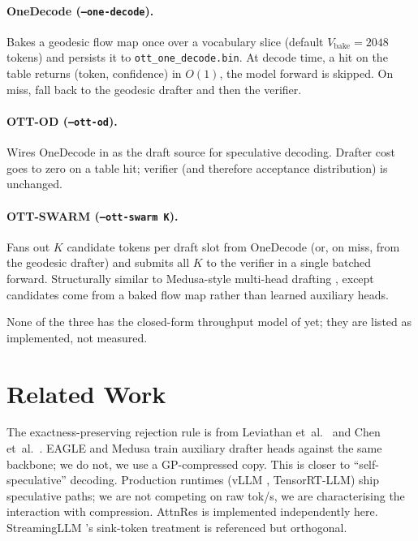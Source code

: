 \documentclass[11pt]{article}
\begin{document}
\paragraph{OneDecode (\texttt{--one-decode}).}  Bakes a geodesic flow
map once over a vocabulary slice (default $V_\text{bake}{=}2048$
tokens) and persists it to \texttt{ott\_one\_decode.bin}.  At decode
time, a hit on the table returns (token, confidence) in $O(1)$, the
model forward is skipped.  On miss, fall back to the geodesic drafter
and then the verifier.

\paragraph{OTT-OD (\texttt{--ott-od}).}  Wires OneDecode in as the
draft source for speculative decoding.  Drafter cost goes to zero
on a table hit; verifier (and therefore acceptance distribution) is
unchanged.

\paragraph{OTT-SWARM (\texttt{--ott-swarm K}).}  Fans out $K$ candidate
tokens per draft slot from OneDecode (or, on miss, from the geodesic
drafter) and submits all $K$ to the verifier in a single batched forward.
Structurally similar to Medusa-style multi-head drafting
\cite{cai2024medusa}, except candidates come from a baked flow map
rather than learned auxiliary heads.

\noindent
None of the three has the closed-form throughput model of
 yet; they are listed as
implemented, not measured.

\section{Related Work}
The exactness-preserving rejection rule is from Leviathan et~al.\
\cite{leviathan2023speculative} and Chen et~al.\ \cite{chen2023speculative}.
EAGLE \cite{li2024eagle} and Medusa \cite{cai2024medusa} train auxiliary
drafter heads against the same backbone; we do not, we use a
GP-compressed copy.  This is closer to ``self-speculative''
decoding.  Production runtimes (vLLM \cite{kwon2023vllm}, TensorRT-LLM)
ship speculative paths; we are not competing on raw tok/s, we are
characterising the interaction with compression.  AttnRes is implemented
independently here.  StreamingLLM \cite{xiao2023streamingllm}'s sink-token
treatment is referenced but orthogonal.
\end{document}
